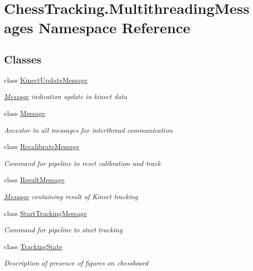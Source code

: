 \hypertarget{namespace_chess_tracking_1_1_multithreading_messages}{}\section{Chess\+Tracking.\+Multithreading\+Messages Namespace Reference}
\label{namespace_chess_tracking_1_1_multithreading_messages}
\subsection*{Classes}
\begin{DoxyCompactItemize}
\item 
class \mbox{\hyperlink{class_chess_tracking_1_1_multithreading_messages_1_1_kinect_update_message}{Kinect\+Update\+Message}}
\begin{DoxyCompactList}\small\item\em \mbox{\hyperlink{class_chess_tracking_1_1_multithreading_messages_1_1_message}{Message}} indication update in kinect data \end{DoxyCompactList}\item 
class \mbox{\hyperlink{class_chess_tracking_1_1_multithreading_messages_1_1_message}{Message}}
\begin{DoxyCompactList}\small\item\em Ancestor to all messages for interthread communication \end{DoxyCompactList}\item 
class \mbox{\hyperlink{class_chess_tracking_1_1_multithreading_messages_1_1_recalibrate_message}{Recalibrate\+Message}}
\begin{DoxyCompactList}\small\item\em Command for pipeline to reset calibration and track \end{DoxyCompactList}\item 
class \mbox{\hyperlink{class_chess_tracking_1_1_multithreading_messages_1_1_result_message}{Result\+Message}}
\begin{DoxyCompactList}\small\item\em \mbox{\hyperlink{class_chess_tracking_1_1_multithreading_messages_1_1_message}{Message}} containing result of Kinect tracking \end{DoxyCompactList}\item 
class \mbox{\hyperlink{class_chess_tracking_1_1_multithreading_messages_1_1_start_tracking_message}{Start\+Tracking\+Message}}
\begin{DoxyCompactList}\small\item\em Command for pipeline to start tracking \end{DoxyCompactList}\item 
class \mbox{\hyperlink{class_chess_tracking_1_1_multithreading_messages_1_1_tracking_state}{Tracking\+State}}
\begin{DoxyCompactList}\small\item\em Description of presence of figures on chessboard \end{DoxyCompactList}\end{DoxyCompactItemize}
